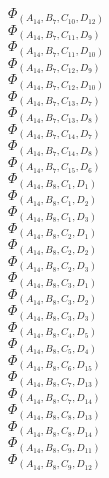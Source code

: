 \documentclass[14pt]{article}
\begin{document}
    $\Phi_{({A}_{14}, {B}_{7}, {C}_{10}, {D}_{12})}$ \\ 
    $\Phi_{({A}_{14}, {B}_{7}, {C}_{11}, {D}_{9})}$ \\ 
    $\Phi_{({A}_{14}, {B}_{7}, {C}_{11}, {D}_{10})}$ \\ 
    $\Phi_{({A}_{14}, {B}_{7}, {C}_{12}, {D}_{9})}$ \\ 
    $\Phi_{({A}_{14}, {B}_{7}, {C}_{12}, {D}_{10})}$ \\ 
    $\Phi_{({A}_{14}, {B}_{7}, {C}_{13}, {D}_{7})}$ \\ 
    $\Phi_{({A}_{14}, {B}_{7}, {C}_{13}, {D}_{8})}$ \\ 
    $\Phi_{({A}_{14}, {B}_{7}, {C}_{14}, {D}_{7})}$ \\ 
    $\Phi_{({A}_{14}, {B}_{7}, {C}_{14}, {D}_{8})}$ \\ 
    $\Phi_{({A}_{14}, {B}_{7}, {C}_{15}, {D}_{6})}$ \\ 
    $\Phi_{({A}_{14}, {B}_{8}, {C}_{1}, {D}_{1})}$ \\ 
    $\Phi_{({A}_{14}, {B}_{8}, {C}_{1}, {D}_{2})}$ \\ 
    $\Phi_{({A}_{14}, {B}_{8}, {C}_{1}, {D}_{3})}$ \\ 
    $\Phi_{({A}_{14}, {B}_{8}, {C}_{2}, {D}_{1})}$ \\ 
    $\Phi_{({A}_{14}, {B}_{8}, {C}_{2}, {D}_{2})}$ \\ 
    $\Phi_{({A}_{14}, {B}_{8}, {C}_{2}, {D}_{3})}$ \\ 
    $\Phi_{({A}_{14}, {B}_{8}, {C}_{3}, {D}_{1})}$ \\ 
    $\Phi_{({A}_{14}, {B}_{8}, {C}_{3}, {D}_{2})}$ \\ 
    $\Phi_{({A}_{14}, {B}_{8}, {C}_{3}, {D}_{3})}$ \\ 
    $\Phi_{({A}_{14}, {B}_{8}, {C}_{4}, {D}_{5})}$ \\ 
    $\Phi_{({A}_{14}, {B}_{8}, {C}_{5}, {D}_{4})}$ \\ 
    $\Phi_{({A}_{14}, {B}_{8}, {C}_{6}, {D}_{15})}$ \\ 
    $\Phi_{({A}_{14}, {B}_{8}, {C}_{7}, {D}_{13})}$ \\ 
    $\Phi_{({A}_{14}, {B}_{8}, {C}_{7}, {D}_{14})}$ \\ 
    $\Phi_{({A}_{14}, {B}_{8}, {C}_{8}, {D}_{13})}$ \\ 
    $\Phi_{({A}_{14}, {B}_{8}, {C}_{8}, {D}_{14})}$ \\ 
    $\Phi_{({A}_{14}, {B}_{8}, {C}_{9}, {D}_{11})}$ \\ 
    $\Phi_{({A}_{14}, {B}_{8}, {C}_{9}, {D}_{12})}$ \\ 
\end{document}
